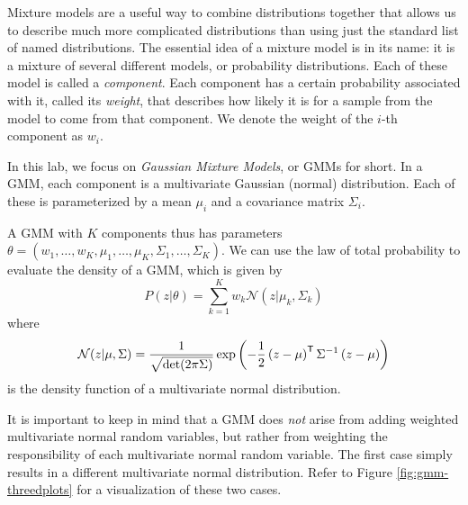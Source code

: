 Mixture models are a useful way to combine distributions together that allows us to describe much more complicated distributions than using just the standard list of named distributions.
The essential idea of a mixture model is in its name: it is a mixture of several different models, or probability distributions.
Each of these model is called a \emph{component}.
Each component has a certain probability associated with it, called its \emph{weight}, that describes how likely it is for a sample from the model to come from that component.
We denote the weight of the \(i\)-th component as \(w_i\).

In this lab, we focus on \emph{Gaussian Mixture Models}, or GMMs for short.
In a GMM, each component is a multivariate %
 Gaussian (normal) distribution.
Each of these is parameterized by a mean \(\mu_i\) and a covariance matrix \(\Sigma_i\).

A GMM with \(K\) components thus has parameters \(\theta = \left(w_1,\ldots,w_K, \mu_1,\ldots,\mu_K,\Sigma_1,\ldots,\Sigma_K\right)
\).
We can use the law of total probability to evaluate the density of a GMM, which is given by 
\[
P(z | \theta) = \sum_{k=1}^{K} w_{k} \mathcal{N}(z | \mu_{k}, \Sigma_{k})
\]
where
\[
\mathcal{N}(z | \mu, \Sigma) = \frac{1}{\sqrt{\det(2\pi\Sigma)}} \exp\left({-\frac{1}{2} \left(z - \mu \right)^{\mathsf T}  \Sigma^{-1} \left(z - \mu\right)}\right)
\]
is the density function of a multivariate normal distribution.

It is important to keep in mind that a GMM does \emph{not} arise from adding weighted multivariate normal random variables, but rather from weighting the responsibility of each multivariate normal random variable. 
The first case simply results in a different multivariate normal distribution. %
Refer to Figure \ref{fig:gmm-threedplots} for a visualization of these two cases.

